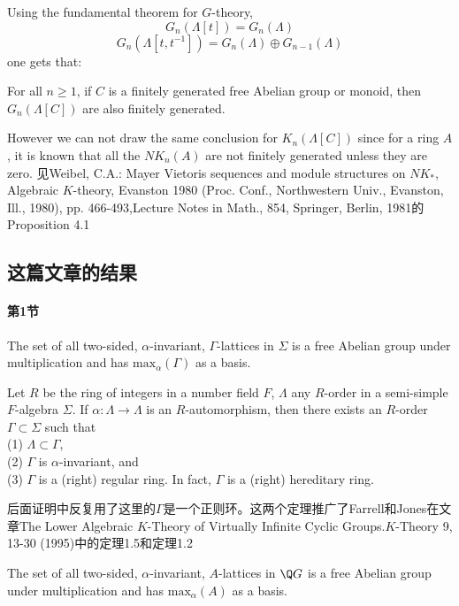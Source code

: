 Using the fundamental theorem for $G$-theory,
\[G_n(\Lambda[t])=G_n(\Lambda)\]
\[G_n(\Lambda[t,t^{-1}])=G_n(\Lambda)\oplus G_{n-1}(\Lambda)\] 
one gets that:
\begin{corollary}
For all $n \geq 1$, if $C$ is a finitely generated free Abelian group or monoid, then $G_n (\Lambda[C])$ are also finitely generated.
\end{corollary}

\begin{remark}
However we can not draw the same conclusion for $K_n(\Lambda[C])$ since for a ring $A$, it is known that {\color{red} all the $ NK_n(A)$ are not finitely generated unless they are zero}. 见Weibel, C.A.: Mayer Vietoris sequences and module structures on $NK_*$, Algebraic $K$-theory, Evanston 1980 (Proc. Conf., Northwestern Univ., Evanston, Ill., 1980), pp. 466-493,Lecture Notes in Math., 854, Springer, Berlin, 1981的Proposition 4.1
\end{remark} 
\subsection{这篇文章的结果}
\paragraph{第1节} 
\begin{theorem}[1.1]
The set of all two-sided, $\alpha$-invariant, $\Gamma$-lattices in $\Sigma$ is a free Abelian group under multiplication and has $\mathrm{max}_\alpha(\Gamma) $ as a basis.
\end{theorem}
\begin{theorem}[1.6]
Let $R$ be the ring of integers in a number field $F$, $\Lambda$ any $R$-order in a semi-simple $F$-algebra $\Sigma$. If $\alpha : \Lambda \rightarrow \Lambda $ is an $R$-automorphism, then there
exists an $R$-order $\Gamma \subset \Sigma $ such that\\
(1) $\Lambda \subset \Gamma $,\\
(2) $\Gamma$ is $\alpha$-invariant, and\\
(3) $\Gamma$ is a (right) {\color{red}regular} ring. In fact, $\Gamma$  is a (right) hereditary ring.
\end{theorem}
后面证明中反复用了这里的$\Gamma$是一个正则环。这两个定理推广了Farrell和Jones在文章The Lower Algebraic $K$-Theory of Virtually Infinite Cyclic
Groups.$K$-Theory 9, 13-30 (1995)中的定理1.5和定理1.2
\begin{theorem}
The  set  of all two-sided,  $\alpha$-invariant,  $A$-lattices in $\Q G$  is  a  free 
Abelian  group  under  multiplication and  has  $\mathrm{max}_{\alpha}( A ) $ as a basis. 
\end{theorem}

